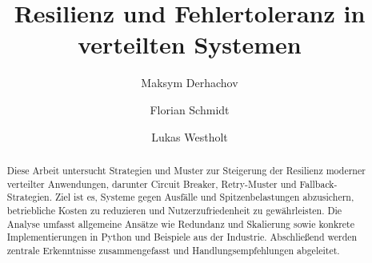\documentclass[acmtog]{acmart}
\begin{document}
\title{Resilienz und Fehlertoleranz in verteilten Systemen}

\author{Maksym Derhachov}
\author{Florian Schmidt}
\authornotemark[1]
\author{Lukas Westholt}
\authornotemark[1]
\renewcommand{\shortauthors}{Derhachov, Schmidt und Westholt}

\begin{abstract}

Diese Arbeit untersucht Strategien und Muster zur Steigerung der Resilienz moderner verteilter Anwendungen,
darunter Circuit Breaker, Retry-Muster und Fallback-Strategien.
Ziel ist es, Systeme gegen Ausfälle und Spitzenbelastungen abzusichern, betriebliche Kosten zu reduzieren
und Nutzerzufriedenheit zu gewährleisten.
Die Analyse umfasst allgemeine Ansätze wie Redundanz und Skalierung sowie konkrete Implementierungen in Python
und Beispiele aus der Industrie.
Abschließend werden zentrale Erkenntnisse zusammengefasst und Handlungsempfehlungen abgeleitet.
\end{abstract}

\maketitle











\end{document}
